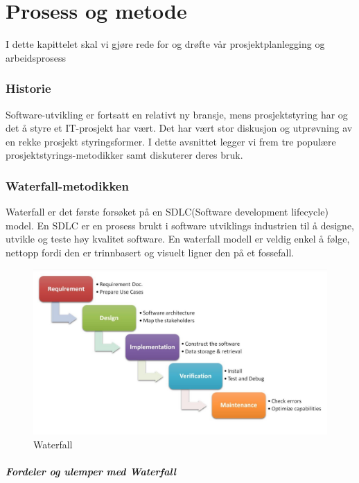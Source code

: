 \chapter{\textbf{Prosess og metode}}
\newthought I dette kapittelet skal vi gjøre rede for og drøfte vår prosjektplanlegging og arbeidsprosess

\subsection{\textbf{Historie}}

Software-utvikling er fortsatt en relativt ny bransje, mens prosjektstyring har  og det å styre et IT-prosjekt har vært. Det har vært stor diskusjon og utprøvning av en rekke prosjekt styringsformer. I dette avsnittet legger vi frem tre populære prosjektstyrings-metodikker samt diskuterer deres bruk.


\subsection{\textbf{Waterfall-metodikken}}

Waterfall er det første forsøket på en SDLC(Software development lifecycle) model. En SDLC er en prosess brukt i software utviklings industrien til å designe, utvikle og teste høy kvalitet software. En waterfall modell er veldig enkel å følge, nettopp fordi den er trinnbasert og visuelt ligner den på et fossefall. 

\begin{figure}[H] 
    \centering
    \includegraphics[width=\textwidth]{figures/Prosess-og-metode/waterfall.jpg}
    \caption{Waterfall}
\end{figure}



\paragraph{\textbf{Fordeler og ulemper med Waterfall}}


